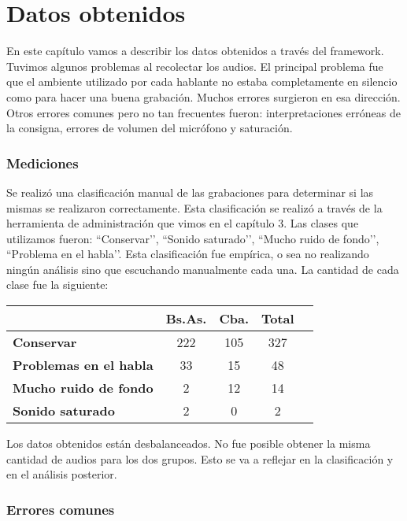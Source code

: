 \chapter{Datos obtenidos}

En este capítulo vamos a describir los datos obtenidos a través del framework. Tuvimos algunos problemas al recolectar los audios. El principal problema fue que el ambiente utilizado por cada hablante no estaba completamente en silencio como para hacer una buena grabación. Muchos errores surgieron en esa dirección. Otros errores comunes pero no tan frecuentes fueron: interpretaciones erróneas de la consigna, errores de volumen del micrófono y saturación. 

\subsection{Mediciones}

Se realizó una clasificación manual de las grabaciones para determinar si las mismas se realizaron correctamente. Esta clasificación se realizó a  través de la herramienta de administración que vimos en el capítulo 3. Las clases que utilizamos fueron: ``Conservar’’, ``Sonido saturado’’, ``Mucho ruido de fondo’’, ``Problema en el habla’’. Esta clasificación fue empírica, o sea no realizando ningún análisis sino que escuchando manualmente cada una. La cantidad de cada clase fue la siguiente:

\begin{table}[h]
\centering
\begin{tabular}{|l|c|c|c|c|}
\hline
\textbf{}  & \textbf{Bs.As. } & \textbf{Cba.} & \textbf{Total} \\ \hline
\textbf{Conservar}  & 222 & 105 & 327 \\ \hline
\textbf{Problemas en el habla}  & 33 & 15 & 48 \\ \hline
\textbf{Mucho ruido de fondo}  & 2 & 12 & 14 \\ \hline
\textbf{Sonido saturado}  & 2 & 0 & 2 \\ \hline
\end{tabular}
\end{table}

Los datos obtenidos están desbalanceados. No fue posible obtener la misma cantidad de audios para los dos grupos. Esto se va a reflejar en la clasificación y en el análisis posterior.

\subsection{Errores comunes}

